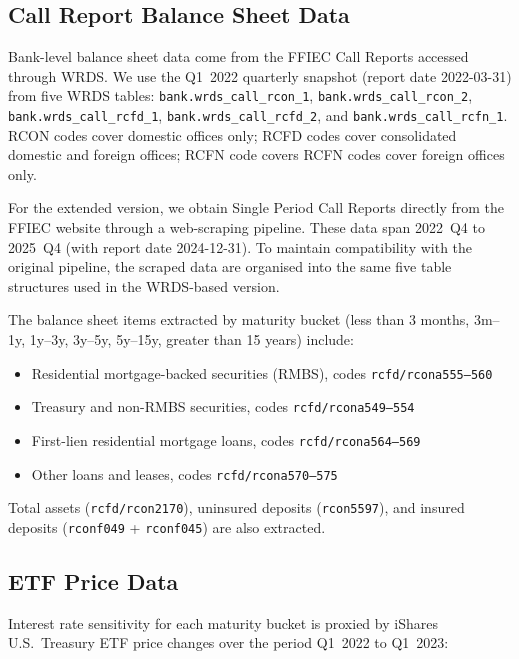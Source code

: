 \documentclass[12pt]{article}
\begin{document}
\subsection{Call Report Balance Sheet Data}

Bank-level balance sheet data come from the FFIEC Call Reports accessed
through WRDS.  We use the Q1~2022 quarterly snapshot (report date
2022-03-31) from five WRDS tables:
\texttt{bank.wrds\_call\_rcon\_1}, \texttt{bank.wrds\_call\_rcon\_2},
\texttt{bank.wrds\_call\_rcfd\_1}, \texttt{bank.wrds\_call\_rcfd\_2},
and \texttt{bank.wrds\_call\_rcfn\_1}.
RCON codes cover domestic offices only; RCFD codes cover consolidated
domestic and foreign offices; RCFN code covers RCFN codes cover foreign offices only.

For the extended version, we obtain Single Period Call Reports directly
from the FFIEC website through a web-scraping pipeline. These data span
2022~Q4 to 2025~Q4 (with report date 2024-12-31). To maintain
compatibility with the original pipeline, the scraped data are organised
into the same five table structures used in the WRDS-based version.

The balance sheet items extracted by maturity bucket (less than 3 months,
3m--1y, 1y--3y, 3y--5y, 5y--15y, greater than 15 years) include:
\begin{itemize}
  \item Residential mortgage-backed securities (RMBS), codes
        \texttt{rcfd/rcona555--560}
  \item Treasury and non-RMBS securities, codes \texttt{rcfd/rcona549--554}
  \item First-lien residential mortgage loans, codes
        \texttt{rcfd/rcona564--569}
  \item Other loans and leases, codes \texttt{rcfd/rcona570--575}
\end{itemize}
Total assets (\texttt{rcfd/rcon2170}), uninsured deposits
(\texttt{rcon5597}), and insured deposits (\texttt{rconf049} +
\texttt{rconf045}) are also extracted.

\subsection{ETF Price Data}

Interest rate sensitivity for each maturity bucket is proxied by iShares
U.S.\ Treasury ETF price changes over the period Q1~2022 to Q1~2023:
\end{document}
